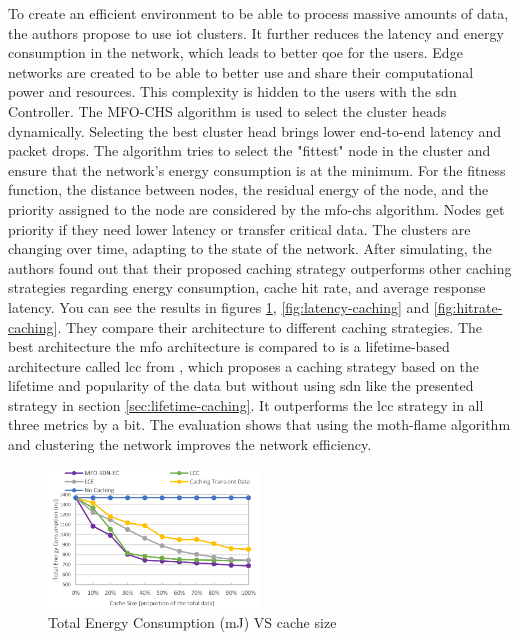 \documentclass[conference]{IEEEtran}
\begin{document}
	To create an efficient environment to be able to process massive amounts of data, the authors propose to use \ac{iot} clusters. It further reduces the latency and energy consumption in the network, which leads to better \ac{qoe} for the users. Edge networks are created to be able to better use and share their computational power and resources. This complexity is hidden to the users with the \ac{sdn} Controller. The MFO-CHS algorithm is used to select the cluster heads dynamically. Selecting the best cluster head brings lower end-to-end latency and packet drops. The algorithm tries to select the "fittest" node in the cluster and ensure that the network's energy consumption is at the minimum. For the fitness function, the distance between nodes, the residual energy of the node, and the priority assigned to the node are considered by the \ac{mfo-chs} algorithm. Nodes get priority if they need lower latency or transfer critical data. The clusters are changing over time, adapting to the state of the network. After simulating, the authors found out that their proposed caching strategy outperforms other caching strategies regarding energy consumption, cache hit rate, and average response latency. You can see the results in figures \ref{fig:energy-caching}, \ref{fig:latency-caching} and \ref{fig:hitrate-caching}. They compare their architecture to different caching strategies. The best architecture the \ac{mfo} architecture is compared to is a lifetime-based architecture called \ac{lcc} from \cite{caching-6}, which proposes a caching strategy based on the lifetime and popularity of the data but without using \ac{sdn} like the presented strategy \cite{caching-2} in section \ref{sec:lifetime-caching}. It outperforms the \ac{lcc} strategy in all three metrics by a bit. The evaluation shows that using the moth-flame algorithm and clustering the network improves the network efficiency.

	\begin{figure}
		\centering
		\includegraphics[width=0.5\textwidth]{figures/energy-caching.png}
		\caption{Total Energy Consumption (mJ) VS cache size \cite{caching-1}}
		\label{fig:energy-caching}
	\end{figure}
\end{document}
